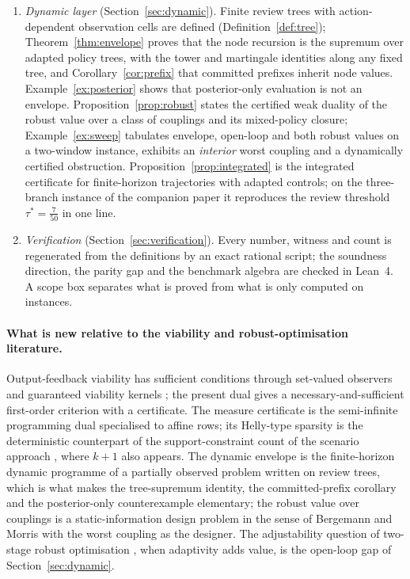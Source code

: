 \documentclass[11pt,a4paper]{article}
\theoremstyle{plain}
\theoremstyle{definition}
\theoremstyle{remark}
\newcommand{\tfr}[2]{\tfrac{#1}{#2}}
\begin{document}
\begin{enumerate}[leftmargin=1.6em,itemsep=1pt]
\item \emph{Dynamic layer} (Section~\ref{sec:dynamic}). Finite review trees with action-dependent observation cells are defined (Definition~\ref{def:tree}); Theorem~\ref{thm:envelope} proves that the node recursion is the supremum over adapted policy trees, with the tower and martingale identities along any fixed tree, and Corollary~\ref{cor:prefix} that committed prefixes inherit node values. Example~\ref{ex:posterior} shows that posterior-only evaluation is not an envelope. Proposition~\ref{prop:robust} states the certified weak duality of the robust value over a class of couplings and its mixed-policy closure; Example~\ref{ex:sweep} tabulates envelope, open-loop and both robust values on a two-window instance, exhibits an \emph{interior} worst coupling and a dynamically certified obstruction. Proposition~\ref{prop:integrated} is the integrated certificate for finite-horizon trajectories with adapted controls; on the three-branch instance of the companion paper \cite{Abaee2026cert} it reproduces the review threshold $\tau^\ast=\tfr7{50}$ in one line.
\item \emph{Verification} (Section~\ref{sec:verification}). Every number, witness and count is regenerated from the definitions by an exact rational script; the soundness direction, the parity gap and the benchmark algebra are checked in Lean~4. A scope box separates what is proved from what is only computed on instances.
\end{enumerate}

\paragraph{What is new relative to the viability and robust-optimisation literature.} Output-feedback viability has sufficient conditions through set-valued observers and guaranteed viability kernels \cite{Aubin2011,Cardaliaguet2007}; the present dual gives a necessary-and-sufficient first-order criterion with a certificate. The measure certificate is the semi-infinite programming dual \cite{HettichKortanek1993,AndersonNash1987} specialised to affine rows; its Helly-type sparsity is the deterministic counterpart of the support-constraint count of the scenario approach \cite{CalafioreCampi2006,CampiGaratti2008}, where $k+1$ also appears. The dynamic envelope is the finite-horizon dynamic programme of a partially observed problem \cite{Astrom1965,BertsekasShreve1978} written on review trees, which is what makes the tree-supremum identity, the committed-prefix corollary and the posterior-only counterexample elementary; the robust value over couplings is a static-information design problem in the sense of Bergemann and Morris \cite{BergemannMorris2019} with the worst coupling as the designer. The adjustability question of two-stage robust optimisation \cite{WeiZhang2024}, when adaptivity adds value, is the open-loop gap of Section~\ref{sec:dynamic}.
\end{document}

